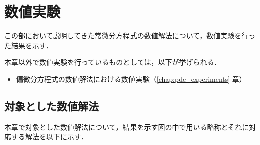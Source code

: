 %

\chapter{数値実験}\label{chap:ode_experiments}

この部において説明してきた常微分方程式の数値解法について，数値実験を行った結果を示す．

本章以外で数値実験を行っているものとしては，以下が挙げられる．

\begin{itemize}
    \item 偏微分方程式の数値解法における数値実験（\ref{chap:pde_experiments} 章）
\end{itemize}

\section{対象とした数値解法}\label{sec:ode_experiments_targeted-solvers}

本章で対象とした数値解法について，結果を示す図の中で用いる略称とそれに対応する解法を以下に示す．

